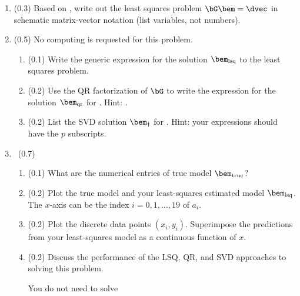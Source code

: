 \documentclass[11pt,titlepage,fleqn]{article}
\begin{document}
\begin{enumerate}
\item (0.3) Based on , write out the least squares problem $\bG\bem = \dvec$ in schematic matrix-vector notation (list variables, not numbers).


\item (0.5) No computing is requested for this problem.

\begin{enumerate}
\item (0.1) Write the generic expression for the solution $\bem_{\rm lsq}$ to the least squares problem.
\item (0.2) Use the QR factorization of $\bG$ to write the expression for the solution $\bem_{\rm qr}$ for \makebox{$\bG\bem = \dvec$}. Hint: \citet[][Appendix A]{Aster}.

\item (0.2) List the SVD solution $\bem_{\dagger}$ for \makebox{$\bG\bem = \dvec$}. Hint: your expressions should have the $p$ subscripts.

\end{enumerate}

\item \ptag\ (0.7)

\begin{enumerate}
\item (0.1) What are the numerical entries of true model $\bem_{\rm true}$?

\item (0.2) Plot the true model and your least-squares estimated model $\bem_{\rm lsq}$. The $x$-axis can be the index $i = 0,1,\ldots,19$ of $a_i$.

\item (0.2) Plot the discrete data points $(x_i,y_i)$. Superimpose the predictions from your least-squares model as a continuous function of $x$.


\item (0.2) Discuss the performance of the LSQ, QR, and SVD approaches to solving this problem.

You do not need to solve

\end{enumerate}


\end{enumerate}
\end{document}
